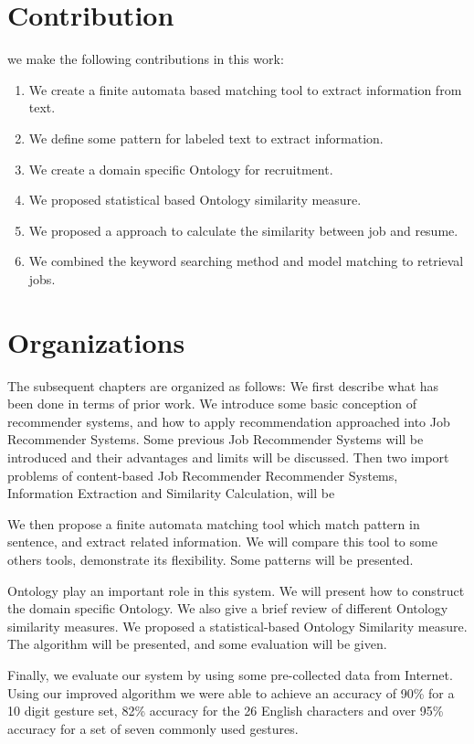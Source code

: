 \section{Contribution}

we make the following contributions in this work:

\begin{enumerate}
    \item  We create a finite automata based matching tool to extract information from text.
    \item  We define some pattern for labeled text to extract information.
    \item  We create a domain specific Ontology for recruitment.
    \item  We proposed statistical based Ontology similarity measure.
    \item  We proposed a approach to calculate the similarity between job and resume.
    \item  We combined the keyword searching method and model matching to retrieval jobs.
\end{enumerate}

\section{Organizations}
The subsequent chapters are organized as follows: We first describe what has been done in terms of prior work.  We introduce some basic conception of recommender systems, and how to apply recommendation approached into Job Recommender Systems. Some previous Job Recommender Systems will be introduced and their advantages and limits will be discussed. Then two import problems of content-based Job Recommender Recommender Systems, Information Extraction and Similarity Calculation, will be

We then propose a finite automata matching tool which match pattern in sentence, and extract related information. We will compare this tool to some others tools, demonstrate its flexibility. Some patterns will be presented.

Ontology play an important role in this system. We will present how to construct the domain specific Ontology. We also give a brief review of different Ontology similarity measures. We proposed a statistical-based Ontology Similarity measure. The algorithm will be presented, and some evaluation will be given.

Finally, we evaluate our system by using some pre-collected data from Internet. Using our improved algorithm we were able to achieve an accuracy of 90\% for a 10 digit gesture set, 82\% accuracy for the 26 English characters and over 95\% accuracy for a set of seven commonly used gestures.
